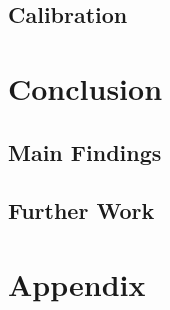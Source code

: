 \documentclass{article}
\begin{document}




\subsection{Calibration}

\section{Conclusion} %
\subsection{Main Findings}



\subsection{Further Work}

\newpage
\raggedright
{}


\newpage
\section{Appendix}
\end{document}
